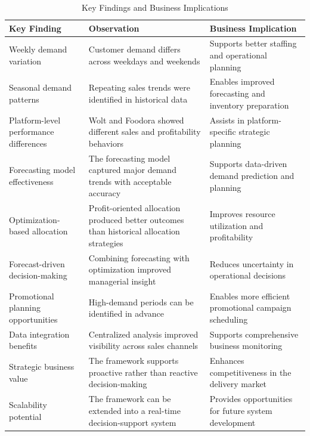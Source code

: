 \begin{table}[h]
\centering
\footnotesize
\renewcommand{\arraystretch}{1.6}
\setlength{\tabcolsep}{4pt}
\begin{tabular}{|p{4cm}|p{5.5cm}|p{4.5cm}|}
\hline
\textbf{Key Finding} & \textbf{Observation} & \textbf{Business Implication} \\ \hline

Weekly demand variation &
Customer demand differs across weekdays and weekends &
Supports better staffing and operational planning \\ \hline

Seasonal demand patterns &
Repeating sales trends were identified in historical data &
Enables improved forecasting and inventory preparation \\ \hline

Platform-level performance differences &
Wolt and Foodora showed different sales and profitability behaviors &
Assists in platform-specific strategic planning \\ \hline

Forecasting model effectiveness &
The forecasting model captured major demand trends with acceptable accuracy &
Supports data-driven demand prediction and planning \\ \hline

Optimization-based allocation &
Profit-oriented allocation produced better outcomes than historical allocation strategies &
Improves resource utilization and profitability \\ \hline

Forecast-driven decision-making &
Combining forecasting with optimization improved managerial insight &
Reduces uncertainty in operational decisions \\ \hline

Promotional planning opportunities &
High-demand periods can be identified in advance &
Enables more efficient promotional campaign scheduling \\ \hline

Data integration benefits &
Centralized analysis improved visibility across sales channels &
Supports comprehensive business monitoring \\ \hline

Strategic business value &
The framework supports proactive rather than reactive decision-making &
Enhances competitiveness in the delivery market \\ \hline

Scalability potential &
The framework can be extended into a real-time decision-support system &
Provides opportunities for future system development \\ \hline

\end{tabular}
\caption{Key Findings and Business Implications}
\label{tab:key_findings}
\end{table}


